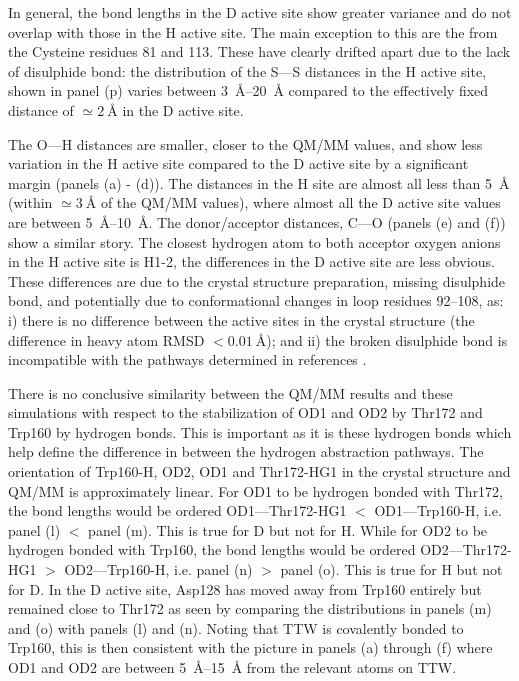 In general, the bond lengths in the D active site show greater variance and do not overlap with those in the H active site. The main exception to this are the from the Cysteine residues 81 and 113. These have clearly drifted apart due to the lack of disulphide bond: the distribution of the S---S distances in the H active site, shown in panel (p) varies between \SIrange{3}{20}{\angstrom} compared to the effectively fixed distance of $\simeq \SI{2}{\angstrom}$ in the D active site. 

The O---H distances are smaller, closer to the QM/MM values, and show less variation in the H active site compared to the D active site by a significant margin (panels (a) - (d)). The distances in the H site are almost all less than \SI{5}{\angstrom} (within $\simeq\SI{3}{\angstrom}$ of the QM/MM values), where almost all the D active site values are between \SIrange{5}{10}{\angstrom}. The donor/acceptor distances, C---O (panels (e) and (f)) show a similar story. The closest hydrogen atom to both acceptor oxygen anions in the H active site is H1-2, the differences in the D active site are less obvious. These differences are due to the crystal structure preparation,  missing disulphide bond, and potentially due to conformational changes in loop residues \numrange[range-phrase=\text{--}]{92}{108}, as: i) there is no difference between the active sites in the crystal structure (the difference in heavy atom RMSD  $<\SI{0.01}{\angstrom}$); and ii) the broken disulphide bond is incompatible with the pathways determined in references \cite{masgrauTunnelingClassicalPaths2007, ranaghanInitioQMMM2017}. 

There is no conclusive similarity between the QM/MM results and these simulations with respect to the stabilization of OD1 and OD2 by Thr172 and Trp160 by hydrogen bonds. This is important as it is these hydrogen bonds which help define the difference in between the hydrogen abstraction pathways. The orientation of Trp160-H, OD2, OD1 and Thr172-HG1 in the crystal structure and QM/MM is approximately linear. For OD1 to be hydrogen bonded with Thr172, the bond lengths would be ordered OD1---Thr172-HG1 $<$ OD1---Trp160-H, i.e. panel (l) $<$ panel (m). This is true for D but not for H. While for OD2 to be hydrogen bonded with Trp160, the bond lengths would be ordered OD2---Thr172-HG1 $>$ OD2---Trp160-H, i.e. panel (n) $>$ panel (o). This is true for H but not for D. In the D active site, Asp128 has moved away from Trp160 entirely but remained close to Thr172 as seen by comparing the distributions in  panels (m) and (o)  with panels (l) and (n). Noting that TTW is covalently bonded to Trp160, this is then consistent with the picture in panels (a) through (f) where OD1 and OD2 are between \SIrange{5}{15}{\angstrom} from the relevant atoms on TTW.  

